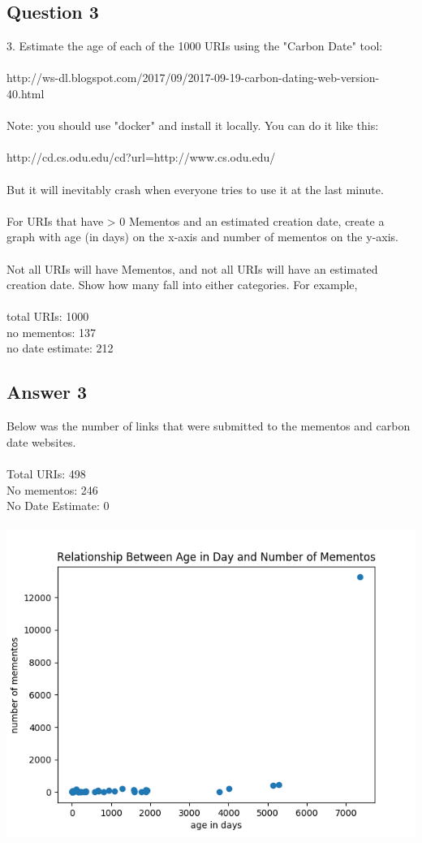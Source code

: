 \documentclass[10pt,letterpaper]{article}
\begin{document}
\subsection{Question 3}
3.  Estimate the age of each of the 1000 URIs using the "Carbon
Date" tool:\\
\\
http://ws-dl.blogspot.com/2017/09/2017-09-19-carbon-dating-web-version-40.html\\
\\
Note: you should use "docker" and install it locally.  You can do
it like this:\\
\\
http://cd.cs.odu.edu/cd?url=http://www.cs.odu.edu/\\
\\
But it will inevitably crash when everyone tries to use it at the
last minute.\\
\\
For URIs that have > 0 Mementos and an estimated creation date,
create a graph with age (in days) on the x-axis and number of
mementos on the y-axis.\\
\\
Not all URIs will have Mementos, and not all URIs will have an
estimated creation date.  Show how many fall into either categories.
For example,\\
\\
total URIs:         1000\\
no mementos:        137\\
no date estimate:   212\\
\subsection{Answer 3}
Below was the number of links that were submitted to the 
mementos and carbon date websites.\\
\\
Total URIs:			498\\
No mementos:		246\\
No Date Estimate:	0\\
\\
\includegraphics[scale=.5]{scatter.png}
\end{document}
